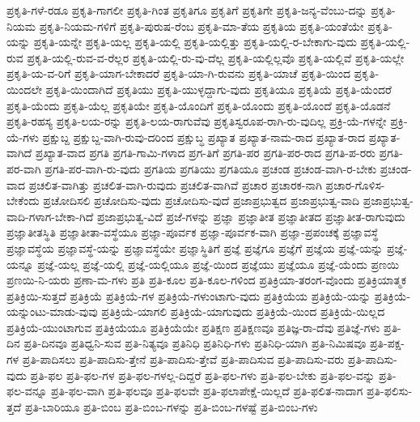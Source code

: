 {ಪ್ರಕೃತಿ-ಗಳೆ-ರಡೂ
ಪ್ರಕೃತಿ-ಗಾಗಲೀ
ಪ್ರಕೃತಿ-ಗಿಂತ
ಪ್ರಕೃತಿಗೂ
ಪ್ರಕೃತಿಗೆ
ಪ್ರಕೃತಿಗೇ
ಪ್ರಕೃತಿ-ಜನ್ಯ-ವೆಂಬು-ದನ್ನು
ಪ್ರಕೃತಿ-ನಿಯಮ
ಪ್ರಕೃತಿ-ನಿಯಮ-ಗಳಿಗೆ
ಪ್ರಕೃತಿ-ಪುರುಷ-ರೆಂಬ
ಪ್ರಕೃತಿ-ಮಾ-ತೆಯ
ಪ್ರಕೃತಿಯ
ಪ್ರಕೃತಿ-ಯಂತೆಯೇ
ಪ್ರಕೃತಿ-ಯನ್ನು
ಪ್ರಕೃತಿ-ಯನ್ನೇ
ಪ್ರಕೃತಿ-ಯಲ್ಲ
ಪ್ರಕೃತಿ-ಯಲ್ಲಿ
ಪ್ರಕೃತಿ-ಯಲ್ಲಿತ್ತು
ಪ್ರಕೃತಿ-ಯಲ್ಲಿ-ರ-ಬೇಕಾಗು-ವುದು
ಪ್ರಕೃತಿ-ಯಲ್ಲಿ-ರುವ
ಪ್ರಕೃತಿ-ಯಲ್ಲಿ-ರುವ-ವ-ರೆಲ್ಲರ
ಪ್ರಕೃತಿ-ಯಲ್ಲಿ-ರು-ವು-ದೆಲ್ಲ
ಪ್ರಕೃತಿ-ಯಲ್ಲಿಲ್ಲವೊ
ಪ್ರಕೃತಿ-ಯಲ್ಲಿವೆ
ಪ್ರಕೃತಿ-ಯಲ್ಲೇ
ಪ್ರಕೃತಿ-ಯ-ವ-ರಿಗೆ
ಪ್ರಕೃತಿ-ಯಾಗ-ಬೇಕಾದರೆ
ಪ್ರಕೃತಿ-ಯಾ-ಗಿ-ರುವನು
ಪ್ರಕೃತಿ-ಯಾಚೆ
ಪ್ರಕೃತಿ-ಯಿಂದ
ಪ್ರಕೃತಿ-ಯಿಂದಲೇ
ಪ್ರಕೃತಿ-ಯಿಂದಾಗಿದೆ
ಪ್ರಕೃತಿಯು
ಪ್ರಕೃತಿ-ಯುಳ್ಳದ್ದಾಗು-ವುದು
ಪ್ರಕೃತಿಯೂ
ಪ್ರಕೃತಿಯೆ
ಪ್ರಕೃತಿ-ಯೆಂದರೆ
ಪ್ರಕೃತಿ-ಯೆಂದು
ಪ್ರಕೃತಿ-ಯೆಲ್ಲ
ಪ್ರಕೃತಿಯೇ
ಪ್ರಕೃತಿ-ಯೊಂದಿಗೆ
ಪ್ರಕೃತಿ-ಯೊಂದು
ಪ್ರಕೃತಿ-ಯೊಂದೆ
ಪ್ರಕೃತಿ-ಯೊಡನೆ
ಪ್ರಕೃತಿ-ರಹಸ್ಯ
ಪ್ರಕೃತಿ-ಲಯ-ರನ್ನು
ಪ್ರಕೃತಿ-ಲಯ-ರಾಗುವೆವು
ಪ್ರಕೃತಿಸ್ವರೂಪ-ರಾಗಿ-ರು-ವುದಿಲ್ಲ
ಪ್ರಕ್ರಿ-ಯೆ-ಗಳನ್ನೇ
ಪ್ರಕ್ರಿ-ಯೆ-ಗಳು
ಪ್ರಕ್ಷುಬ್ದ
ಪ್ರಕ್ಷುಬ್ದ-ವಾಗಿ-ರುವು-ದರಿಂದ
ಪ್ರಕ್ಷುಬ್ಧ
ಪ್ರಖ್ಯಾತ
ಪ್ರಖ್ಯಾತ-ನಾಮ-ರಾದ
ಪ್ರಖ್ಯಾತ-ರಾದ
ಪ್ರಖ್ಯಾತ-ವಾಗಿದೆ
ಪ್ರಖ್ಯಾತ-ವಾದ
ಪ್ರಗತಿ
ಪ್ರಗತಿ-ಗಾಮಿ-ಗಳಾದ
ಪ್ರಗ-ತಿಗೆ
ಪ್ರಗತಿ-ಪರ
ಪ್ರಗತಿ-ಪರ-ರಾದ
ಪ್ರಗತಿ-ಪ-ರರು
ಪ್ರಗತಿ-ಪರ-ವಾಗಿ
ಪ್ರಗತಿ-ಪರ-ವಾಗಿ-ರು-ವುದು
ಪ್ರಗತಿಯ
ಪ್ರಗತಿಯು
ಪ್ರಗತಿಯೂ
ಪ್ರಚಂಡ
ಪ್ರಚಂಡ-ವಾಗಿ-ರ-ಬೇಕು
ಪ್ರಚಂಡ-ವಾದ
ಪ್ರಚಲಿತ-ವಾಗಿತ್ತು
ಪ್ರಚಲಿತ-ವಾಗಿ-ರುವುದು
ಪ್ರಚಲಿತ-ವಾಗಿವೆ
ಪ್ರಚಾರ
ಪ್ರಚಾರಕ-ನಾಗಿ
ಪ್ರಚಾರ-ಗೊಳಿಸ-ಬೇಕೆಂದು
ಪ್ರಚೋದಿಸಲಿ
ಪ್ರಚೋದಿಸು-ವುದು
ಪ್ರಚೋದಿಸು-ವುದೆ
ಪ್ರಜಾಪ್ರಭುತ್ವದ
ಪ್ರಜಾಪ್ರಭುತ್ವ-ವಾದಿ
ಪ್ರಜಾಪ್ರಭುತ್ವ-ವಾದಿ-ಗಳಾಗ-ಬೇಕಾ-ಗಿದೆ
ಪ್ರಜಾಪ್ರಭುತ್ವ-ವಿದೆ
ಪ್ರಜೆ-ಗಳನ್ನು
ಪ್ರಜ್ಞಾ
ಪ್ರಜ್ಞಾತೀತ
ಪ್ರಜ್ಞಾತೀತದ
ಪ್ರಜ್ಞಾತೀತ-ರಾಗುವುದು
ಪ್ರಜ್ಞಾತೀತಸ್ಥಿತಿ
ಪ್ರಜ್ಞಾತೀತಾ-ವಸ್ಥೆಯೂ
ಪ್ರಜ್ಞಾ-ಪೂರ್ವಕ
ಪ್ರಜ್ಞಾ-ಪೂರ್ವಕ-ವಾಗಿ
ಪ್ರಜ್ಞಾ-ಪ್ರಪಂಚಕ್ಕೆ
ಪ್ರಜ್ಞಾವಸ್ಥೆ
ಪ್ರಜ್ಞಾವಸ್ಥೆಯ
ಪ್ರಜ್ಞಾವಸ್ಥೆ-ಯನ್ನು
ಪ್ರಜ್ಞಾವಸ್ಥೆಯೇ
ಪ್ರಜ್ಞಾಸ್ಥಿತಿಗೆ
ಪ್ರಜ್ಞೆ
ಪ್ರಜ್ಞೆಗೂ
ಪ್ರಜ್ಞೆಗೆ
ಪ್ರಜ್ಞೆಯ
ಪ್ರಜ್ಞೆ-ಯನ್ನು
ಪ್ರಜ್ಞೆ-ಯನ್ನೂ
ಪ್ರಜ್ಞೆ-ಯಲ್ಲ
ಪ್ರಜ್ಞೆ-ಯಲ್ಲಿ
ಪ್ರಜ್ಞೆ-ಯಲ್ಲಿಯೂ
ಪ್ರಜ್ಞೆ-ಯಿಂದ
ಪ್ರಜ್ಞೆಯು
ಪ್ರಜ್ಞೆಯೂ
ಪ್ರಜ್ಞೆ-ಯೆಂದು
ಪ್ರಣಯಿ
ಪ್ರಣಯಿ-ನಿ-ಯರು
ಪ್ರಣಾ-ಮ-ಗಳು
ಪ್ರತಿ
ಪ್ರತಿ-ಕೂಲ
ಪ್ರತಿ-ಕೂಲ-ಗಳಿಂದ
ಪ್ರತಿಕ್ರಿಯಾ-ತರಂಗ-ವೊಂದು
ಪ್ರತಿಕ್ರಿಯಾತ್ಮಕ
ಪ್ರತಿಕ್ರಿಯಿ-ಸುತ್ತದೆ
ಪ್ರತಿಕ್ರಿಯೆ
ಪ್ರತಿಕ್ರಿಯೆ-ಗಳ
ಪ್ರತಿಕ್ರಿಯೆ-ಗಳುಂಟಾಗು-ವುದು
ಪ್ರತಿಕ್ರಿಯೆಯ
ಪ್ರತಿಕ್ರಿಯೆ-ಯನ್ನು
ಪ್ರತಿಕ್ರಿಯೆ-ಯನ್ನುಂಟು-ಮಾಡು-ವುವು
ಪ್ರತಿಕ್ರಿಯೆ-ಯಾಗಲಿ
ಪ್ರತಿಕ್ರಿಯೆ-ಯಾಗುವುದು
ಪ್ರತಿಕ್ರಿಯೆ-ಯಿಂದ
ಪ್ರತಿಕ್ರಿಯೆ-ಯಿಲ್ಲದ
ಪ್ರತಿಕ್ರಿಯೆ-ಯುಂಟಾಗುವ
ಪ್ರತಿಕ್ರಿಯೆಯೂ
ಪ್ರತಿಕ್ರಿಯೆಯೇ
ಪ್ರತಿಕ್ಷಣ
ಪ್ರತಿಕ್ಷಣವೂ
ಪ್ರತಿಜ್ಞ-ರಾ-ದೆವು
ಪ್ರತಿಜ್ಞೆ-ಗಳು
ಪ್ರತಿ-ದಿನ
ಪ್ರತಿ-ದಿನವೂ
ಪ್ರತಿಧ್ವನಿ-ಸುವ
ಪ್ರತಿ-ನಿತ್ಯವೂ
ಪ್ರತಿನಿಧಿ
ಪ್ರತಿನಿಧಿ-ಗಳು
ಪ್ರತಿನಿಧಿ-ಯಾಗಿ
ಪ್ರತಿ-ನಿಮಿಷವೂ
ಪ್ರತಿ-ಪಕ್ಷ-ಗಳ
ಪ್ರತಿ-ಪಾದಿಸಲು
ಪ್ರತಿ-ಪಾದಿಸು-ತ್ತೇನೆ
ಪ್ರತಿ-ಪಾದಿಸು-ತ್ತೇವೆ
ಪ್ರತಿ-ಪಾದಿಸುವ
ಪ್ರತಿ-ಪಾದಿಸು-ವರು
ಪ್ರತಿ-ಪಾದಿಸು-ವುದು
ಪ್ರತಿ-ಫಲ
ಪ್ರತಿ-ಫಲ-ಗಳ
ಪ್ರತಿ-ಫಲ-ಗಳಲ್ಲ-ದಿದ್ದರೆ
ಪ್ರತಿ-ಫಲ-ಗಳು
ಪ್ರತಿ-ಫಲ-ಬೇಕು
ಪ್ರತಿ-ಫಲ-ವನ್ನು
ಪ್ರತಿ-ಫಲ-ವನ್ನೂ
ಪ್ರತಿ-ಫಲ-ವಾಗಿ
ಪ್ರತಿ-ಫಲವೂ
ಪ್ರತಿ-ಫಲವೇ
ಪ್ರತಿ-ಫಲಾಪೇಕ್ಷೆ-ಯಿಲ್ಲದೆ
ಪ್ರತಿ-ಫಲಿತ-ನಾದಾಗ
ಪ್ರತಿ-ಫಲಿಸು-ತ್ತದೆ
ಪ್ರತಿ-ಬಾರಿಯೂ
ಪ್ರತಿ-ಬಿಂಬ
ಪ್ರತಿ-ಬಿಂಬ-ಗಳನ್ನು
ಪ್ರತಿ-ಬಿಂಬ-ಗಳಷ್ಟೆ
ಪ್ರತಿ-ಬಿಂಬ-ಗಳು
}
